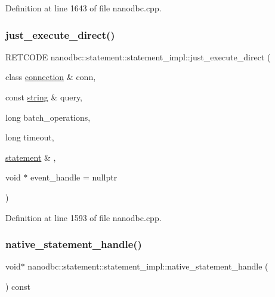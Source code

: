 Definition at line 1643 of file nanodbc.\+cpp.

\mbox{\label{classnanodbc_1_1statement_1_1statement__impl_a25cb3555f5ccec43b844cb33996cac97}} 
\subsubsection{\texorpdfstring{just\_execute\_direct()}{just\_execute\_direct()}}
{\footnotesize\ttfamily R\+E\+T\+C\+O\+DE nanodbc\+::statement\+::statement\+\_\+impl\+::just\+\_\+execute\+\_\+direct (\begin{DoxyParamCaption}\item[{class \mbox{\hyperlink{classnanodbc_1_1connection}{connection}} \&}]{conn,  }\item[{const \mbox{\hyperlink{namespacenanodbc_abfc0ece56278e590911ec8352774c212}{string}} \&}]{query,  }\item[{long}]{batch\+\_\+operations,  }\item[{long}]{timeout,  }\item[{\mbox{\hyperlink{classnanodbc_1_1statement}{statement}} \&}]{,  }\item[{void $\ast$}]{event\+\_\+handle = {\ttfamily nullptr} }\end{DoxyParamCaption})\hspace{0.3cm}{\ttfamily [inline]}}



Definition at line 1593 of file nanodbc.\+cpp.

\mbox{\label{classnanodbc_1_1statement_1_1statement__impl_a5adfc093b2f1377bf6ecf050c3ae76b9}} 
\subsubsection{\texorpdfstring{native\_statement\_handle()}{native\_statement\_handle()}}
{\footnotesize\ttfamily void$\ast$ nanodbc\+::statement\+::statement\+\_\+impl\+::native\+\_\+statement\+\_\+handle (\begin{DoxyParamCaption}{ }\end{DoxyParamCaption}) const\hspace{0.3cm}{\ttfamily [inline]}}



